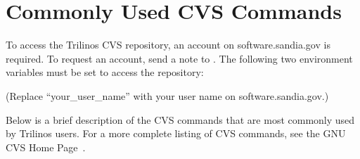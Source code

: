 \documentclass[12pt,relax]{TrilinosUserGuide}
\begin{document}

\clearpage

%


\appendix
\section{Commonly Used CVS Commands}
\label{Section:CVS}
To access the Trilinos CVS repository, an account on software.sandia.gov is 
required.  To request an account, send a note to 
.  
The following two 
environment variables must be set to access the repository:


(Replace ``your\_user\_name'' with your user name on software.sandia.gov.)

Below is a brief description of the CVS commands that are most commonly 
used by Trilinos users.  For a 
more complete listing of CVS commands, see the GNU CVS Home Page~\cite{CVS}.
\end{document}
